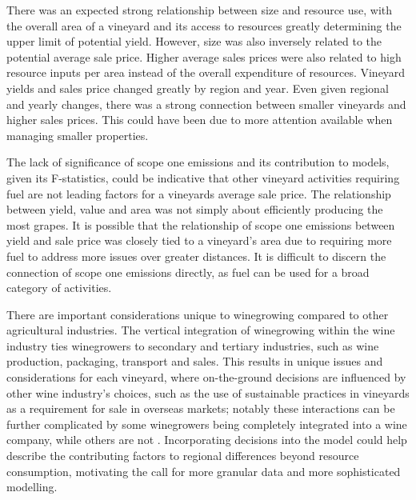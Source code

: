 \documentclass[review,12pt,authoryear]{elsarticle}
\begin{document}
\begin{linenumbers}
There was an expected strong relationship between size and resource use, with the overall area of a vineyard and its access to resources greatly determining the upper limit of potential yield. However, size was also inversely related to the potential average sale price. Higher average sales prices were also related to high resource inputs per area instead of the overall expenditure of resources. Vineyard yields and sales price changed greatly by region and year. Even given regional and yearly changes, there was a strong connection between smaller vineyards and higher sales prices. This could have been due to more attention available when managing smaller properties.
\par
The lack of significance of scope one emissions and its contribution to models, given its F-statistics, could be indicative that other vineyard activities requiring fuel are not leading factors for a vineyards average sale price. The relationship between yield, value and area was not simply about efficiently producing the most grapes. It is possible that the relationship of scope one emissions between yield and sale price was closely tied to a vineyard's area due to requiring more fuel to address more issues over greater distances. It is difficult to discern the connection of scope one emissions directly, as fuel can be used for a broad category of activities. 
\par
There are important considerations unique to winegrowing compared to other agricultural industries. The vertical integration of winegrowing within the wine industry ties winegrowers to secondary and tertiary industries, such as wine production, packaging, transport and sales. This results in unique issues and considerations for each vineyard, where on-the-ground decisions are influenced by other wine industry's choices, such as the use of sustainable practices in vineyards as a requirement for sale in overseas markets; notably these interactions can be further complicated by some winegrowers being completely integrated into a wine company, while others are not \citep{knightFirmResourcesDevelopment2019}. Incorporating decisions into the model could help describe the contributing factors to regional differences beyond resource consumption, motivating the call for more granular data and more sophisticated modelling.
\par

\end{linenumbers}
\end{document}
